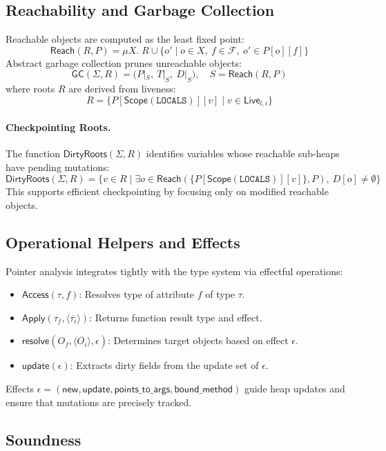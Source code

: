 \subsection{Reachability and Garbage Collection}

Reachable objects are computed as the least fixed point:
\[
\mathsf{Reach}(R,P) = \mu X.\; R \cup \{ o' \mid o \in X,\ f \in \mathcal{F},\ o' \in P[o][f] \}
\]
Abstract garbage collection prunes unreachable objects:
\[
\mathsf{GC}(\Sigma,R) = \big( P|_S,\ T|_S,\ D|_S \big),
\quad
S = \mathsf{Reach}(R,P)
\]
where roots $R$ are derived from liveness:
\[
R = \big\{ P[\mathsf{Scope}(\mathtt{LOCALS})][v] \mid v \in \mathsf{Live}_{l,i} \big\}
\]

\paragraph{Checkpointing Roots.}
The function $\mathsf{DirtyRoots}(\Sigma,R)$ identifies variables whose reachable sub-heaps have pending mutations:
\[
\mathsf{DirtyRoots}(\Sigma,R)
    = \{ v \in R \mid \exists o \in \mathsf{Reach}(\{P[\mathsf{Scope}(\mathtt{LOCALS})][v]\},P),\ D[o] \neq \emptyset \}
\]
This supports efficient checkpointing by focusing only on modified reachable objects.

\subsection{Operational Helpers and Effects}

Pointer analysis integrates tightly with the type system via effectful operations:
\begin{itemize}
    \item $\mathsf{Access}(\tau,f)$: Resolves type of attribute $f$ of type $\tau$.
    \item $\mathsf{Apply}(\tau_f,\langle\overline{\tau_i}\rangle)$: Returns function result type and effect.
    \item $\mathsf{resolve}(O_f,\langle\overline{O_i}\rangle,\epsilon)$: Determines target objects based on effect $\epsilon$.
    \item $\mathsf{update}(\epsilon)$: Extracts dirty fields from the update set of $\epsilon$.
\end{itemize}
Effects $\epsilon = (\mathsf{new},\mathsf{update},\mathsf{points\_to\_args},\mathsf{bound\_method})$ guide heap updates and ensure that mutations are precisely tracked.

\subsection{Soundness}

